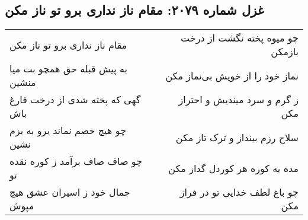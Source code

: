 \begin{center}
\section*{غزل شماره ۲۰۷۹: مقام ناز نداری برو تو ناز مکن}
\label{sec:2079}
\begin{longtable}{l p{0.5cm} r}
مقام ناز نداری برو تو ناز مکن
&&
چو میوه پخته نگشت از درخت بازمکن
\\
به پیش قبله حق همچو بت میا منشین
&&
نماز خود را از خویش بی‌نماز مکن
\\
گهی که پخته شدی از درخت فارغ باش
&&
ز گرم و سرد میندیش و احتراز مکن
\\
چو هیچ خصم نماند برو به بزم نشین
&&
سلاح رزم بینداز و ترک تاز مکن
\\
چو صاف صاف برآمد ز کوره نقده تو
&&
مده به کوره هر کوردل گداز مکن
\\
جمال خود ز اسیران عشق هیچ مپوش
&&
چو باغ لطف خدایی تو در فراز مکن
\\
\end{longtable}
\end{center}
